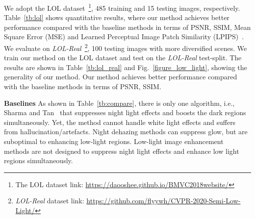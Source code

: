 \documentclass[runningheads]{llncs}
\begin{document}
We adopt the LOL dataset~\cite{chen2018retinex}\footnote{The LOL dataset link: \url{https://daooshee.github.io/BMVC2018website/}}, 485 training and 15 testing images, respectively.
Table~\ref{tb:lol} shows quantitative results, where our method achieves better performance compared with the baseline methods in terms of PSNR, SSIM, Mean Square Error (MSE) and Learned Perceptual Image Patch Similarity (LPIPS)~\cite{zhang2018unreasonable}.
We evaluate on \textit{LOL-Real}~\cite{yang2021sparse}\footnote{\textit{LOL-Real} dataset link: \url{https://github.com/flyywh/CVPR-2020-Semi-Low-Light/}}, 100 testing images with more diversified scenes. 
We train our method on the LOL dataset and test on the \textit{LOL-Real} test-split. 
The results are shown in Table~\ref{tb:lol_real} and Fig.~\ref{figure_low_light}, showing the generality of our method.
Our method achieves better performance compared with the baseline methods in terms of PSNR, SSIM.

\begin{figure*}[t]
	\captionsetup[subfigure]{font=small, labelformat=empty}
	\captionsetup[subfloat]{farskip=1pt}
	\centering
{}\hfill
	\hfill
	\hfill
	\hfill
	\hfill	
{}\hfill
	\hfill
	\hfill
	\hfill
	\hfill
	\caption{Low-light enhancement results on the LOL-test~\cite{chen2018retinex}, \textit{LOL-Real}~\cite{yang2021sparse} datasets.}
	\label{figure_low_light}
\end{figure*}

\noindent \textbf{Baselines}
As shown in Table~\ref{tb:compare}, there is only one algorithm, i.e., Sharma and Tan~\cite{sharma2021nighttime} that suppresses night light effects and boosts the dark regions simultaneously. Yet, the method cannot handle white light effects and suffers from hallucination/artefacts.
Night dehazing methods can suppress glow, but are suboptimal to enhancing low-light regions. Low-light image enhancement methods are not designed to suppress night light effects and enhance low light regions simultaneously.
\end{document}
